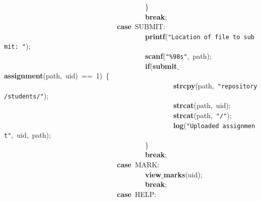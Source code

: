 \mbox{}\ \ \ \ \ \ \ \ \ \ \ \ \ \ \ \ \ \ \ \ \ \ \ \ \ \ \ \ \ \ \ \ \ \ \ \ \ \ \ \ \} \\
\mbox{}\ \ \ \ \ \ \ \ \ \ \ \ \ \ \ \ \ \ \ \ \ \ \ \ \ \ \ \ \ \ \ \ \ \ \ \ \ \ \ \ \textbf{break}; \\
\mbox{}\ \ \ \ \ \ \ \ \ \ \ \ \ \ \ \ \ \ \ \ \ \ \ \ \ \ \ \ \ \ \ \ \textbf{case}\ SUBMIT: \\
\mbox{}\ \ \ \ \ \ \ \ \ \ \ \ \ \ \ \ \ \ \ \ \ \ \ \ \ \ \ \ \ \ \ \ \ \ \ \ \ \ \ \ \textbf{printf}(\texttt{"{}Location\ of\ file\ to\ submit:\ "{}}); \\
\mbox{}\ \ \ \ \ \ \ \ \ \ \ \ \ \ \ \ \ \ \ \ \ \ \ \ \ \ \ \ \ \ \ \ \ \ \ \ \ \ \ \ \textbf{scanf}(\texttt{"{}\%98s"{}},\ path); \\
\mbox{}\ \ \ \ \ \ \ \ \ \ \ \ \ \ \ \ \ \ \ \ \ \ \ \ \ \ \ \ \ \ \ \ \ \ \ \ \ \ \ \ \textbf{if}(\textbf{submit$\_$assignment}(path,\ uid)\ ==\ 1)\ \{ \\
\mbox{}\ \ \ \ \ \ \ \ \ \ \ \ \ \ \ \ \ \ \ \ \ \ \ \ \ \ \ \ \ \ \ \ \ \ \ \ \ \ \ \ \ \ \ \ \ \ \ \ \textbf{strcpy}(path,\ \texttt{"{}repository/students/"{}}); \\
\mbox{}\ \ \ \ \ \ \ \ \ \ \ \ \ \ \ \ \ \ \ \ \ \ \ \ \ \ \ \ \ \ \ \ \ \ \ \ \ \ \ \ \ \ \ \ \ \ \ \ \textbf{strcat}(path,\ uid); \\
\mbox{}\ \ \ \ \ \ \ \ \ \ \ \ \ \ \ \ \ \ \ \ \ \ \ \ \ \ \ \ \ \ \ \ \ \ \ \ \ \ \ \ \ \ \ \ \ \ \ \ \textbf{strcat}(path,\ \texttt{"{}/"{}}); \\
\mbox{}\ \ \ \ \ \ \ \ \ \ \ \ \ \ \ \ \ \ \ \ \ \ \ \ \ \ \ \ \ \ \ \ \ \ \ \ \ \ \ \ \ \ \ \ \ \ \ \ \textbf{log}(\texttt{"{}Uploaded\ assignment"{}},\ uid,\ path);\ \ \ \ \ \ \ \ \ \ \ \ \ \ \ \ \ \ \ \ \ \ \ \ \ \ \ \ \ \ \ \ \ \ \ \ \ \ \ \ \ \ \ \ \ \ \ \  \\
\mbox{}\ \ \ \ \ \ \ \ \ \ \ \ \ \ \ \ \ \ \ \ \ \ \ \ \ \ \ \ \ \ \ \ \ \ \ \ \ \ \ \ \} \\
\mbox{}\ \ \ \ \ \ \ \ \ \ \ \ \ \ \ \ \ \ \ \ \ \ \ \ \ \ \ \ \ \ \ \ \ \ \ \ \ \ \ \ \textbf{break}; \\
\mbox{}\ \ \ \ \ \ \ \ \ \ \ \ \ \ \ \ \ \ \ \ \ \ \ \ \ \ \ \ \ \ \ \ \textbf{case}\ MARK: \\
\mbox{}\ \ \ \ \ \ \ \ \ \ \ \ \ \ \ \ \ \ \ \ \ \ \ \ \ \ \ \ \ \ \ \ \ \ \ \ \ \ \ \ \textbf{view$\_$marks}(uid); \\
\mbox{}\ \ \ \ \ \ \ \ \ \ \ \ \ \ \ \ \ \ \ \ \ \ \ \ \ \ \ \ \ \ \ \ \ \ \ \ \ \ \ \ \textbf{break}; \\
\mbox{}\ \ \ \ \ \ \ \ \ \ \ \ \ \ \ \ \ \ \ \ \ \ \ \ \ \ \ \ \ \ \ \ \textbf{case}\ HELP: \\
